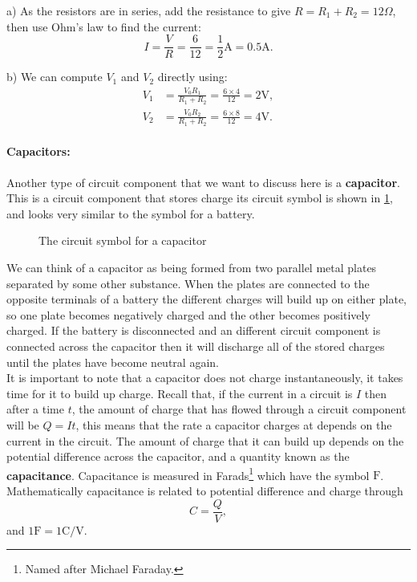 a) As the resistors are in series, add the resistance to give $R=R_{1}+R_{2}=12\Omega$, then use Ohm's law to find the current:
\begin{equation*}
I=\frac{V}{R}=\frac{6}{12}=\frac{1}{2}\text{A}=0.5\text{A}.
\end{equation*}

b) We can compute $V_{1}$ and $V_{2}$ directly using:
\begin{align*}
V_{1}&=\frac{V_{0}R_{1}}{R_{1}+R_{2}}=\frac{6\times 4}{12}=2\text{V},\\
V_{2}&=\frac{V_{0}R_{2}}{R_{1}+R_{2}}=\frac{6\times 8}{12}=4\text{V}.
\end{align*}



\paragraph{Capacitors:} Another type of circuit component that we want to discuss here is a \textbf{capacitor}. This is a circuit component that stores charge its circuit symbol is shown in \cref{fig: capacitor}, and looks very similar to the symbol for a battery.
  \begin{figure}[ht]
    \centering
    \caption{The circuit symbol for a capacitor}
    \label{fig: capacitor}
\end{figure}

We can think of a capacitor as being formed from two parallel metal plates separated by some other substance. When the plates are connected to the opposite terminals of a battery the different charges will build up on either plate, so one plate becomes negatively charged and the other becomes positively charged. If the battery is disconnected and an different circuit component is connected across the capacitor then it will discharge all of the stored charges until the plates have become neutral again.\\

It is important to note that a capacitor does not charge instantaneously, it takes time for it to build up charge. Recall that, if the current in a circuit is $I$ then after a time $t$, the amount of charge that has flowed through a circuit component will be $Q=It$, this means that the rate a capacitor charges at depends on the current in the circuit.  The amount of charge that it can build up depends on the potential difference across the capacitor, and a quantity known as the \textbf{capacitance}. Capacitance is measured in Farads\footnote{Named after Michael Faraday.} which have the symbol $\text{F}$. Mathematically capacitance is related to potential difference and charge through
\begin{equation}
C=\frac{Q}{V},
\label{eq: capacitance eq}
\end{equation} 
and $1\text{F}=1\text{C/V}$.\\

